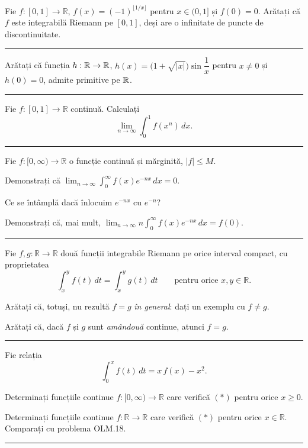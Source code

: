 Fie $f : [0,1] \to \mathbb{R}$, $f(x) = (-1)^{\lfloor 1/x \rfloor}$ pentru $x \in (0,1]$ și $f(0) = 0$. Arătați că $f$ este integrabilă Riemann pe $[0,1]$, deși are o infinitate de puncte de discontinuitate.
\vspace{1mm}\hrule

Arătați că funcția $h : \mathbb{R} \to \mathbb{R}$, $h(x) = \bigl(1 + \sqrt{|x|}\bigr) \sin \dfrac{1}{x}$ pentru $x \neq 0$ și $h(0) = 0$, admite primitive pe $\mathbb{R}$.
\vspace{1mm}\hrule

Fie $f:[0,1]\to\mathbb{R}$ continuă. Calculați
\[ \lim_{n\to\infty}\int_0^1 f(x^n)\,dx. \]
\vspace{1mm}\hrule

Fie $f:[0,\infty)\to\mathbb{R}$ o funcție continuă și mărginită, $|f|\le M$.
\begin{parti}
  \item Demonstrați că $\displaystyle\lim_{n\to\infty}\int_0^{\infty}f(x)e^{-nx}\,dx=0$.
  \item Ce se întâmplă dacă înlocuim $e^{-nx}$ cu $e^{-n}$?
  \item Demonstrați că, mai mult,
        $\displaystyle\lim_{n\to\infty}n\int_0^{\infty}f(x)e^{-nx}\,dx=f(0)$.
\end{parti}
\vspace{1mm}\hrule

Fie $f,g:\mathbb{R}\to\mathbb{R}$ două funcții integrabile Riemann pe orice
interval compact, cu proprietatea
\[ \int_x^{y}f(t)\,dt=\int_x^{y}g(t)\,dt\qquad\text{pentru orice }x,y\in\mathbb{R}. \]
\begin{parti}
  \item Arătați că, totuși, nu rezultă $f=g$ \emph{în general}: dați un exemplu cu $f\neq g$.
  \item Arătați că, dacă $f$ și $g$ sunt \emph{amândouă} continue, atunci $f=g$.
\end{parti}
\vspace{1mm}\hrule

Fie relația
\[ \int_0^x f(t)\,dt = x\,f(x) - x^2. \tag{$\ast$} \]
\begin{parti}
  \item Determinați funcțiile continue $f:[0,\infty)\to\mathbb{R}$ care verifică
        $(\ast)$ pentru orice $x\ge0$.
  \item Determinați funcțiile continue $f:\mathbb{R}\to\mathbb{R}$ care verifică
        $(\ast)$ pentru orice $x\in\mathbb{R}$. Comparați cu problema OLM.18.
\end{parti}
\vspace{1mm}\hrule

